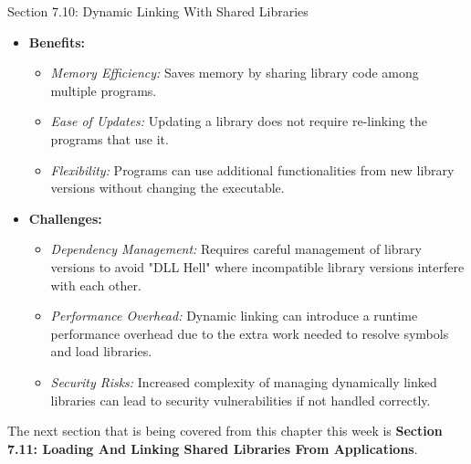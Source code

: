 \begin{notes}{Section 7.10: Dynamic Linking With Shared Libraries}
    \begin{itemize}
        \item \textbf{Benefits:}
            \begin{itemize}
                \item \emph{Memory Efficiency:} Saves memory by sharing library code among multiple programs.
                \item \emph{Ease of Updates:} Updating a library does not require re-linking the programs that use it.
                \item \emph{Flexibility:} Programs can use additional functionalities from new library versions without changing the executable.
            \end{itemize}
        \item \textbf{Challenges:}
            \begin{itemize}
                \item \emph{Dependency Management:} Requires careful management of library versions to avoid "DLL Hell" where incompatible library versions interfere with each other.
                \item \emph{Performance Overhead:} Dynamic linking can introduce a runtime performance overhead due to the extra work needed to resolve symbols and load libraries.
                \item \emph{Security Risks:} Increased complexity of managing dynamically linked libraries can lead to security vulnerabilities if not handled correctly.
            \end{itemize}
    \end{itemize}    
\end{notes}

The next section that is being covered from this chapter this week is \textbf{Section 7.11: Loading And Linking Shared Libraries From Applications}.


